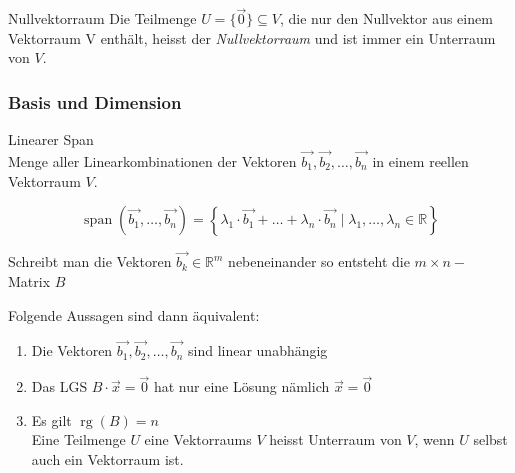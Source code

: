     \begin{definition}{Nullvektorraum}
        Die Teilmenge $U=\{\vec{0}\}\subseteq V$, die nur den Nullvektor aus einem Vektorraum V enthält, 
        heisst der \textit{Nullvektorraum} und ist immer ein Unterraum von $V$.
    \end{definition}





\subsubsection*{Basis und Dimension}

\begin{definition}{Linearer Span}\\
    Menge aller Linearkombinationen der Vektoren $\overrightarrow{b_{1}}, \overrightarrow{b_{2}}, \ldots, \overrightarrow{b_{n}}$ in einem reellen Vektorraum $V$.

    $$
    \operatorname{span}\left(\overrightarrow{b_{1}}, \ldots, \overrightarrow{b_{n}}\right)=\left\{\lambda_{1} \cdot \overrightarrow{b_{1}}+ \ldots +\lambda_{n} \cdot \overrightarrow{b_{n}} \mid \lambda_{1}, \ldots, \lambda_{n} \in \mathbb{R}\right\}
    $$

    Schreibt man die Vektoren $\overrightarrow{b_{k}} \in \mathbb{R}^{m}$ nebeneinander so entsteht die $m \times n-$ Matrix $B$

    Folgende Aussagen sind dann äquivalent:

    \begin{enumerate}
    \item Die Vektoren $\overrightarrow{b_{1}}, \overrightarrow{b_{2}}, \ldots, \overrightarrow{b_{n}}$ sind linear unabhängig

    \item Das LGS $B \cdot \vec{x}=\overrightarrow{0}$ hat nur eine Lösung nämlich $\vec{x}=\overrightarrow{0}$

    \item Es gilt $\operatorname{rg}(B)=n$\\
    Eine Teilmenge $U$ eine Vektorraums $V$ heisst Unterraum von $V$, wenn $U$ selbst auch ein Vektorraum ist.

    \end{enumerate}
\end{definition}

